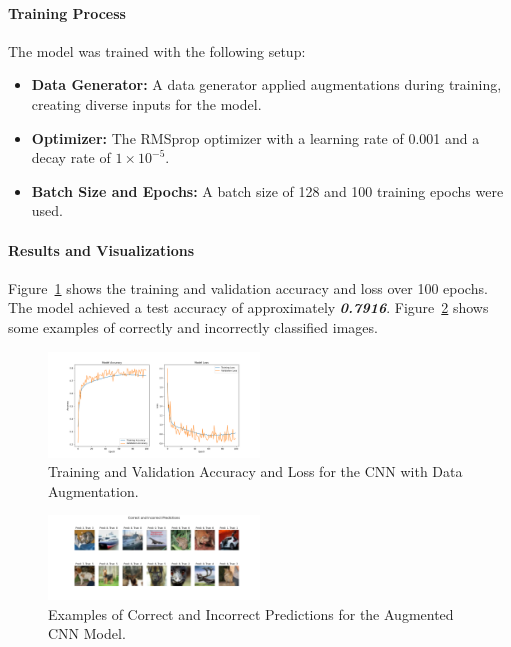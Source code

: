 \documentclass[lettersize,journal]{IEEEtran}
\begin{document}
\paragraph{\textbf{Training Process}}

The model was trained with the following setup:
\begin{itemize}
    \item \textbf{Data Generator:} A data generator applied augmentations during training, creating diverse inputs for the model.
    \item \textbf{Optimizer:} The RMSprop optimizer with a learning rate of 0.001 and a decay rate of \(1 \times 10^{-5}\).
    \item \textbf{Batch Size and Epochs:} A batch size of 128 and 100 training epochs were used.
\end{itemize}

\paragraph{\textbf{Results and Visualizations}}

Figure~\ref{fig:cnn_augmented_training_history} shows the training and validation accuracy and loss over 100 epochs. The model achieved a test accuracy of approximately \textbf{\textit{0.7916}}. Figure~\ref{fig:cnn_augmented_sample_predictions} shows some examples of correctly and incorrectly classified images.

\begin{figure}[h!]
    \centering
    \includegraphics[width=0.5\textwidth]{training_history_CNN_Augmented.png}
    \caption{Training and Validation Accuracy and Loss for the CNN with Data Augmentation.}
    \label{fig:cnn_augmented_training_history}
\end{figure}

\begin{figure}[h!]
    \centering
    \includegraphics[width=0.5\textwidth]{sample_predictions_CNN_Augmented.png}
    \caption{Examples of Correct and Incorrect Predictions for the Augmented CNN Model.}
    \label{fig:cnn_augmented_sample_predictions}
\end{figure}
\end{document}
